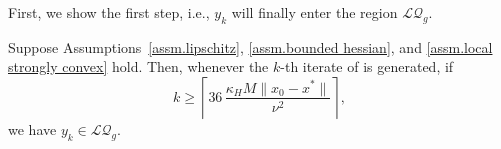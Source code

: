 \documentclass[moor,sglanonrev]{informs4}
\begin{document}
First, we show the first step, i.e., $y_k$ will finally enter the region $\mathcal{LQ}_g$.
    {\color{red}
        \begin{lemma}\label{lem.enter region}
            Suppose Assumptions~\ref{assm.lipschitz}, \ref{assm.bounded hessian},
            and \ref{assm.local strongly convex} hold. Then, whenever the $k$-th iterate of
             is generated, if
            \[
                k\geq
                \left\lceil
                36\,\frac{\kappa_H M \|x_0-x^*\|}{\nu^2}
                \right\rceil,
            \]
            we have $y_k\in\mathcal{LQ}_g$.
        \end{lemma}
    }
\end{document}
